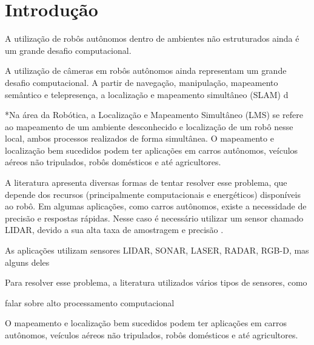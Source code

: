 	\chapter*[Introdução]{Introdução} %
	
	A utilização de robôs autônomos dentro de ambientes não estruturados ainda é um grande desafio computacional.
	
	A utilização de câmeras em robôs autônomos ainda representam um grande desafio computacional.
	A partir de navegação, manipulação, mapeamento semântico e telepresença, a localização e mapeamento simultâneo (SLAM) d
	
	*Na área da Robótica, a Localização e Mapeamento Simultâneo (LMS) se refere ao mapeamento de um ambiente desconhecido e 
	localização de um robô nesse local, ambos processos realizados de forma simultânea. O mapeamento e localização bem sucedidos podem ter aplicações em carros autônomos, veículos aéreos não tripulados, robôs domésticos e até agricultores. 
	
	A literatura apresenta diversas formas de tentar resolver esse problema, que depende dos recursos (principalmente computacionais e energéticos) disponíveis ao robô. Em algumas aplicações, como carros autônomos, existe a necessidade de precisão e respostas rápidas. Nesse caso é necessário utilizar um sensor chamado LIDAR, devido a sua alta taxa de amostragem e precisão \cite{wolcott2017robust}. 
	
	As aplicações utilizam sensores LIDAR, SONAR, LASER, RADAR, RGB-D, mas alguns deles 
	
	Para resolver esse problema, a literatura
	utilizados vários tipos de sensores, como 
	
	
	falar sobre alto processamento computacional
	
	
	 O mapeamento e localização bem sucedidos podem ter aplicações em carros autônomos, veículos aéreos não tripulados, robôs domésticos e até agricultores. 
	
	
	
